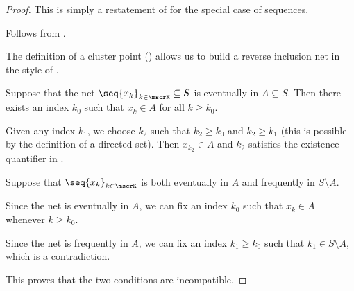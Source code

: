 \begin{proof}
   This is simply a restatement of  for the special case of sequences.

   Follows from .

  The definition of a cluster point () allows us to build a reverse inclusion net in the style of .

   Suppose that the net \( \seq{ x_k }_{k \in \mscrK} \subseteq S \) is eventually in \( A \subseteq S \). Then there exists an index \( k_0 \) such that \( x_k \in A \) for all \( k \geq k_0 \).

  Given any index \( k_1 \), we choose \( k_2 \) such that \( k_2 \geq k_0 \) and \( k_2 \geq k_1 \) (this is possible by the definition of a directed set). Then \( x_{k_2} \in A \) and \( k_2 \) satisfies the existence quantifier in .

   Suppose that \( \seq{ x_k }_{k \in \mscrK} \) is both eventually in \( A \) and frequently in \( S \setminus A \).

  Since the net is eventually in \( A \), we can fix an index \( k_0 \) such that \( x_k \in A \) whenever \( k \geq k_0 \).

  Since the net is frequently in \( A \), we can fix an index \( k_1 \geq k_0 \) such that \( k_1 \in S \setminus A \), which is a contradiction.

  This proves that the two conditions are incompatible.
\end{proof}

